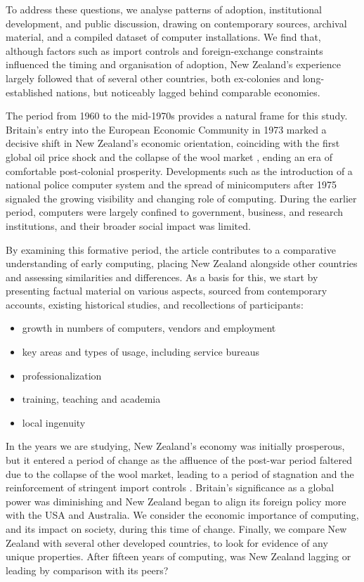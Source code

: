 \documentclass{IEEEcsmag}
\begin{document}
To address these questions, we analyse patterns of adoption, institutional development,
and public discussion, drawing on contemporary sources, archival material, and a compiled
dataset of computer installations. We find that, although factors such as import controls and
foreign-exchange constraints influenced the timing and organisation of adoption,
\cbend  %
New Zealand's
\cbstart  %
experience largely followed that of several other countries, both ex-colonies and long-established
nations, but noticeably lagged behind comparable economies.

The period from 1960 to the mid-1970s provides a natural frame for this study.
Britain's entry into the European Economic Community in 1973 marked a decisive shift in
New Zealand's economic orientation, coinciding with the first global oil price shock and the
collapse of the wool market \cite{Easton-2020},  ending an era of comfortable post-colonial prosperity.
Developments such as the introduction of a national police computer system and the spread
of minicomputers after 1975 signaled the growing visibility and changing role of computing.
During the earlier period, computers were largely confined to government, business, and research
institutions, and their broader social impact was limited.

By examining this formative period, the article contributes to a comparative understanding
of early computing, placing New Zealand alongside other countries and assessing similarities
and differences. As a basis for this, we start by presenting factual material on various aspects,
sourced from contemporary accounts, existing historical studies, and recollections of participants:
\cbend

\begin{itemize}
\item growth in numbers of computers, vendors and employment
\item key areas  and types of usage, including service bureaus
\item professionalization
\item training, teaching and academia
\item local ingenuity
\end{itemize}

\cbstart
In the years we are studying, New Zealand’s economy was initially prosperous,
but it entered a period of change as the affluence of the post-war period faltered due to the collapse of the wool market, leading to a period of stagnation and the reinforcement of stringent import controls \cite{Easton-2020}.
Britain's significance as a global power
was diminishing and New Zealand began to align its foreign policy more with the USA and Australia.
We consider the economic importance of computing, and its impact on society, during this time of change. Finally, we compare New Zealand with several other developed countries, to look for evidence of any unique properties. After fifteen years of computing, was New Zealand lagging or leading by comparison with its peers?
\cbend
\vspace*{-8pt}
\end{document}

